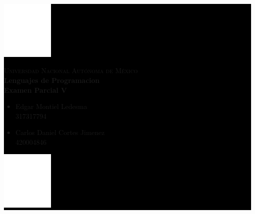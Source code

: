 \documentclass{article}
\begin{document}
\pagecolor{black}
\color{white}

    \colorbox{black}{
        \begin{minipage}[t]{0.16 \textwidth}
           \begin{flushright}
            \includegraphics[width=1in]{UNAM.png}
           \end{flushright}
        \end{minipage}
        \begin{minipage}[H]{0.62 \textwidth}
            \begin{center}
                {\large \textsc{Universdad Nacional Autónoma de México}}
                \vspace{0.25cm}
                \\
                { \large \textbf{Lenguajes de Programacion\\ Examen Parcial V}}                
                \textbf{}
                \begin{multicols}{2}
                \begin{flushleft}
                \begin{itemize}
                    \item  \small Edgar Montiel Ledesma\\ 317317794
    
                    \item \footnotesize Carlos Daniel Cortes Jimenez\\ 420004846
                \end{itemize}
                \end{flushleft}
                \vspace{0.25cm}
                \end{multicols} 
            \end{center}
            \vspace{0.05cm}
        \end{minipage}
        \begin{minipage}[t]{0.16 \textwidth}
            \begin{flushleft}
                \includegraphics[width=1in]{EFC.png}
            \end{flushleft}
        \end{minipage}
    }
    
\end{document}
